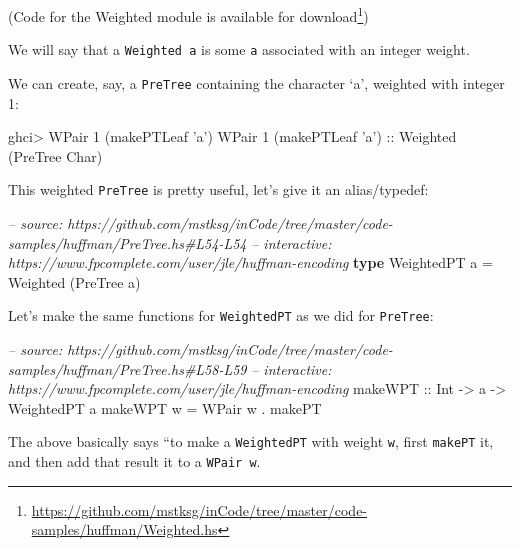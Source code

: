 \documentclass[]{article}
\newenvironment{Shaded}{}{}
\newcommand{\KeywordTok}[1]{\textcolor[rgb]{0.00,0.44,0.13}{\textbf{#1}}}
\newcommand{\DataTypeTok}[1]{\textcolor[rgb]{0.56,0.13,0.00}{#1}}
\newcommand{\DecValTok}[1]{\textcolor[rgb]{0.25,0.63,0.44}{#1}}
\newcommand{\CharTok}[1]{\textcolor[rgb]{0.25,0.44,0.63}{#1}}
\newcommand{\CommentTok}[1]{\textcolor[rgb]{0.38,0.63,0.69}{\textit{#1}}}
\newcommand{\OtherTok}[1]{\textcolor[rgb]{0.00,0.44,0.13}{#1}}
\newcommand{\FunctionTok}[1]{\textcolor[rgb]{0.02,0.16,0.49}{#1}}
\newcommand{\NormalTok}[1]{#1}
\renewcommand{\href}[2]{#2\footnote{\url{#1}}}
\begin{document}
(Code for the Weighted module is
\href{https://github.com/mstksg/inCode/tree/master/code-samples/huffman/Weighted.hs}{available
for download})

We will say that a \texttt{Weighted\ a} is some \texttt{a} associated with an
integer weight.

We can create, say, a \texttt{PreTree} containing the character `a', weighted
with integer 1:

\begin{Shaded}
\begin{Highlighting}[]
\NormalTok{ghci}\FunctionTok{>} \DataTypeTok{WPair} \DecValTok{1}\NormalTok{ (makePTLeaf }\CharTok{'a'}\NormalTok{)}
\DataTypeTok{WPair} \DecValTok{1}\NormalTok{ (makePTLeaf }\CharTok{'a'}\NormalTok{)}\OtherTok{ ::} \DataTypeTok{Weighted}\NormalTok{ (}\DataTypeTok{PreTree} \DataTypeTok{Char}\NormalTok{)}
\end{Highlighting}
\end{Shaded}

This weighted \texttt{PreTree} is pretty useful, let's give it an alias/typedef:

\begin{Shaded}
\begin{Highlighting}[]
\CommentTok{-- source: https://github.com/mstksg/inCode/tree/master/code-samples/huffman/PreTree.hs#L54-L54}
\CommentTok{-- interactive: https://www.fpcomplete.com/user/jle/huffman-encoding}
\KeywordTok{type} \DataTypeTok{WeightedPT}\NormalTok{ a }\FunctionTok{=} \DataTypeTok{Weighted}\NormalTok{ (}\DataTypeTok{PreTree}\NormalTok{ a)}
\end{Highlighting}
\end{Shaded}

Let's make the same functions for \texttt{WeightedPT} as we did for
\texttt{PreTree}:

\begin{Shaded}
\begin{Highlighting}[]
\CommentTok{-- source: https://github.com/mstksg/inCode/tree/master/code-samples/huffman/PreTree.hs#L58-L59}
\CommentTok{-- interactive: https://www.fpcomplete.com/user/jle/huffman-encoding}
\OtherTok{makeWPT ::} \DataTypeTok{Int} \OtherTok{->}\NormalTok{ a }\OtherTok{->} \DataTypeTok{WeightedPT}\NormalTok{ a}
\NormalTok{makeWPT w }\FunctionTok{=} \DataTypeTok{WPair}\NormalTok{ w }\FunctionTok{.}\NormalTok{ makePT}
\end{Highlighting}
\end{Shaded}

The above basically says ``to make a \texttt{WeightedPT} with weight \texttt{w},
first \texttt{makePT} it, and then add that result it to a \texttt{WPair\ w}.
\end{document}
